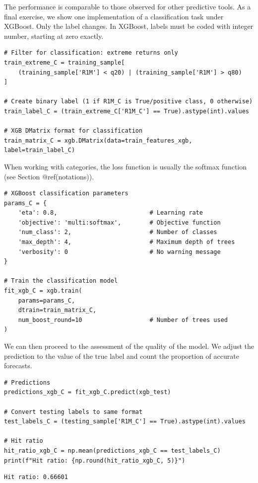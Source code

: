 The performance is comparable to those observed for other predictive tools. As a final exercise, we show one implementation of a classification task under XGBoost. Only the label changes. In XGBoost, labels must be coded with integer number, starting at zero exactly.

\begin{verbatim}
# Filter for classification: extreme returns only
train_extreme_C = training_sample[
    (training_sample['R1M'] < q20) | (training_sample['R1M'] > q80)
]

# Create binary label (1 if R1M_C is True/positive class, 0 otherwise)
train_label_C = (train_extreme_C['R1M_C'] == True).astype(int).values

# XGB DMatrix format for classification
train_matrix_C = xgb.DMatrix(data=train_features_xgb, label=train_label_C)
\end{verbatim}

When working with categories, the loss function is usually the softmax function (see Section @ref(notations)).

\begin{verbatim}
# XGBoost classification parameters
params_C = {
    'eta': 0.8,                          # Learning rate
    'objective': 'multi:softmax',        # Objective function
    'num_class': 2,                      # Number of classes
    'max_depth': 4,                      # Maximum depth of trees
    'verbosity': 0                       # No warning message
}

# Train the classification model
fit_xgb_C = xgb.train(
    params=params_C,
    dtrain=train_matrix_C,
    num_boost_round=10                   # Number of trees used
)
\end{verbatim}

We can then proceed to the assessment of the quality of the model. We adjust the prediction to the value of the true label and count the proportion of accurate forecasts.

\begin{verbatim}
# Predictions
predictions_xgb_C = fit_xgb_C.predict(xgb_test)

# Convert testing labels to same format
test_labels_C = (testing_sample['R1M_C'] == True).astype(int).values

# Hit ratio
hit_ratio_xgb_C = np.mean(predictions_xgb_C == test_labels_C)
print(f"Hit ratio: {np.round(hit_ratio_xgb_C, 5)}")
\end{verbatim}

\begin{verbatim}
Hit ratio: 0.66601
\end{verbatim}

